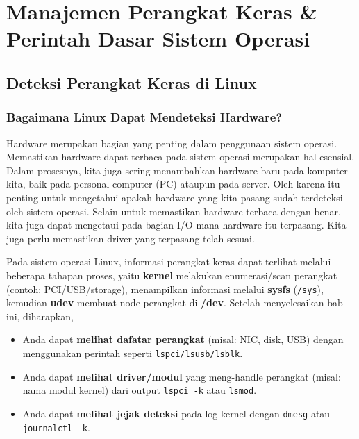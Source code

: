 
\chapter{Manajemen Perangkat Keras \& Perintah Dasar Sistem Operasi}
\label{ch:hardware-and-basic-commands}

\begin{abstract}
Bab ini membahas cara Linux mendeteksi dan mengelola perangkat keras, modul kernel,
driver perangkat, serta perintah-perintah dasar terminal Linux yang esensial untuk praktikum
Ubuntu Server 22.04. Fokus utama bab ini adalah keterampilan praktik: mengidentifikasi perangkat,
mengecek driver/modul kernel, memahami perangkat di \texttt{/dev}, melakukan manipulasi teks
dengan \texttt{grep/sed/awk}, mengelola proses, dan memantau kondisi sistem.
\end{abstract}

\section{Deteksi Perangkat Keras di Linux}
\label{sec:hardware-detection}

\subsection*{Bagaimana Linux Dapat Mendeteksi Hardware?}
Hardware merupakan bagian yang penting dalam penggunaan sistem operasi. Memastikan hardware dapat terbaca pada sistem operasi merupakan hal esensial. Dalam prosesnya, kita juga sering menambahkan hardware baru pada komputer kita, baik pada personal computer (PC) ataupun pada server. Oleh karena itu penting untuk mengetahui apakah hardware yang kita pasang sudah terdeteksi oleh sistem operasi. Selain untuk memastikan hardware terbaca dengan benar, kita juga dapat mengetaui pada bagian I/O mana hardware itu terpasang. Kita juga perlu memastikan driver yang terpasang telah sesuai. 

Pada sistem operasi Linux, informasi perangkat keras dapat terlihat melalui beberapa tahapan proses, yaitu 
\textbf{kernel} melakukan enumerasi/scan perangkat (contoh: PCI/USB/storage), menampilkan informasi melalui \textbf{sysfs} (\texttt{/sys}),
kemudian \textbf{udev} membuat node perangkat di \textbf{/dev}. Setelah menyelesaikan bab ini, diharapkan,
\begin{itemize}
    \item Anda dapat \textbf{melihat dafatar perangkat} (misal: NIC, disk, USB) dengan menggunakan perintah seperti \texttt{lspci/lsusb/lsblk}.
    \item Anda dapat \textbf{melihat driver/modul} yang meng-handle perangkat (misal: nama modul kernel) dari output \texttt{lspci -k} atau \texttt{lsmod}.
    \item Anda dapat \textbf{melihat jejak deteksi} pada log kernel dengan \texttt{dmesg} atau \texttt{journalctl -k}.
\end{itemize}

